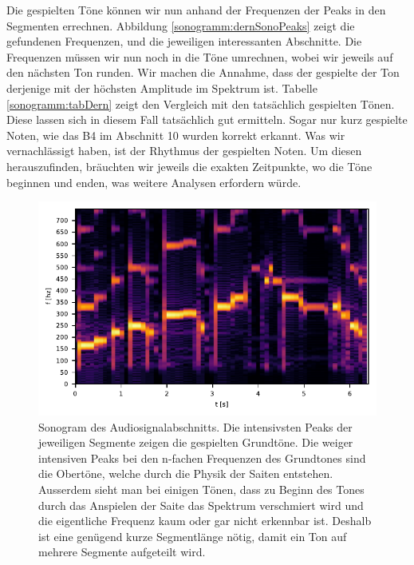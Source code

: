 Die gespielten Töne können wir nun anhand der Frequenzen 
der Peaks in den Segmenten errechnen.
Abbildung \ref{sonogramm:dernSonoPeaks} zeigt die gefundenen Frequenzen, und die
jeweiligen interessanten Abschnitte.
Die Frequenzen müssen wir nun noch in die Töne umrechnen, wobei wir jeweils auf den
nächsten Ton runden.
Wir machen die Annahme, dass der gespielte der Ton derjenige mit der höchsten Amplitude im Spektrum 
ist. 
Tabelle \ref{sonogramm:tabDern} zeigt den Vergleich mit den tatsächlich gespielten Tönen.
Diese lassen sich in diesem Fall tatsächlich gut ermitteln.
Sogar nur kurz gespielte Noten, wie das B4 im Abschnitt 10 
wurden korrekt erkannt.
Was wir vernachlässigt haben, ist der Rhythmus der gespielten Noten.
Um diesen herauszufinden, bräuchten wir jeweils die exakten Zeitpunkte, wo die Töne
beginnen und enden, was weitere Analysen erfordern würde.

\begin{figure}
    \centering
    \includegraphics{papers/sonogramm/images/dernSono1.pdf}
    \caption{Sonogram des Audiosignalabschnitts. Die intensivsten Peaks der 
    jeweiligen Segmente zeigen die gespielten Grundtöne. Die weiger
    intensiven Peaks bei den n-fachen Frequenzen des Grundtones sind die Obertöne, welche durch die Physik der Saiten 
%
    entstehen.
    Ausserdem sieht man bei einigen Tönen, dass zu Beginn des Tones durch das Anspielen der Saite das Spektrum verschmiert wird
    und die eigentliche Frequenz kaum oder gar nicht erkennbar ist.
    Deshalb ist eine genügend kurze Segmentlänge nötig, damit ein Ton auf mehrere Segmente aufgeteilt wird.
    \label{sonogramm:dernSono}
    }
\end{figure}

